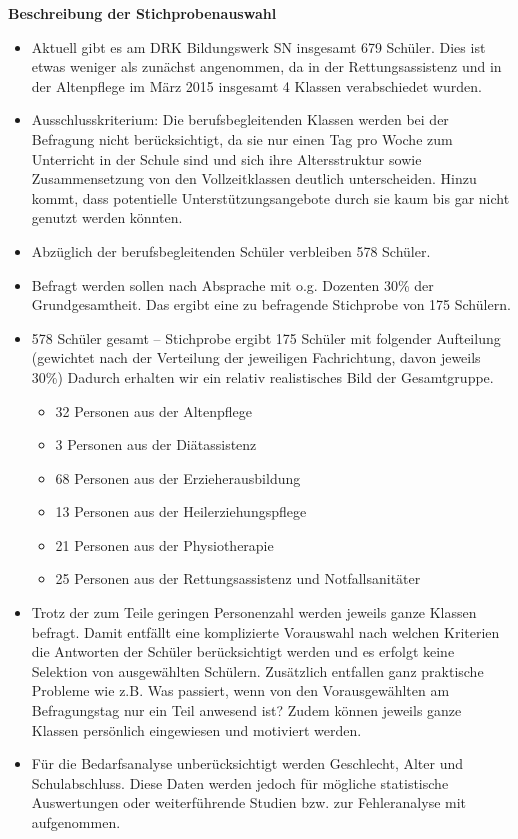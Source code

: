 \textbf{Beschreibung der Stichprobenauswahl}
\begin{itemize}
	\item Aktuell gibt es am DRK Bildungswerk SN insgesamt 679 Schüler. Dies ist etwas weniger als zunächst angenommen, da in der Rettungsassistenz und in der Altenpflege im März 2015 insgesamt 4 Klassen verabschiedet wurden.
	\item Ausschlusskriterium: Die berufsbegleitenden Klassen werden bei der Befragung nicht berücksichtigt, da sie nur einen Tag pro Woche zum Unterricht in der Schule sind und sich ihre Altersstruktur sowie Zusammensetzung von den Vollzeitklassen deutlich unterscheiden. Hinzu kommt, dass potentielle Unterstützungsangebote durch sie kaum bis gar nicht genutzt werden könnten.
	\item Abzüglich der berufsbegleitenden Schüler verbleiben 578 Schüler.
	\item Befragt werden sollen nach Absprache mit o.g. Dozenten 30\% der Grundgesamtheit. Das ergibt eine zu befragende Stichprobe von 175 Schülern.
	\item 578 Schüler gesamt -- Stichprobe ergibt 175 Schüler mit folgender Aufteilung (gewichtet nach der Verteilung der jeweiligen Fachrichtung, davon jeweils 30\%) Dadurch erhalten wir ein relativ realistisches Bild der Gesamtgruppe. 
		\begin{itemize}
			\item 32 Personen aus der Altenpflege 
			\item 3 Personen aus der Diätassistenz
			\item 68 Personen aus der Erzieherausbildung 
			\item 13 Personen aus der Heilerziehungspflege 
			\item 21 Personen aus der Physiotherapie
			\item 25 Personen aus der Rettungsassistenz und Notfallsanitäter
		\end{itemize}
	\item Trotz der zum Teile geringen Personenzahl werden jeweils ganze Klassen befragt. Damit entfällt eine komplizierte Vorauswahl nach welchen Kriterien die Antworten der Schüler berücksichtigt werden und es erfolgt keine Selektion von ausgewählten Schülern. Zusätzlich entfallen ganz praktische Probleme wie z.B. Was passiert, wenn von den Vorausgewählten am Befragungstag nur ein Teil anwesend ist? Zudem können jeweils ganze Klassen persönlich eingewiesen und motiviert werden.
	\item Für die Bedarfsanalyse unberücksichtigt werden Geschlecht, Alter und Schulabschluss. Diese Daten werden jedoch für mögliche statistische Auswertungen oder weiterführende Studien bzw. zur Fehleranalyse mit aufgenommen.

\end{itemize}
